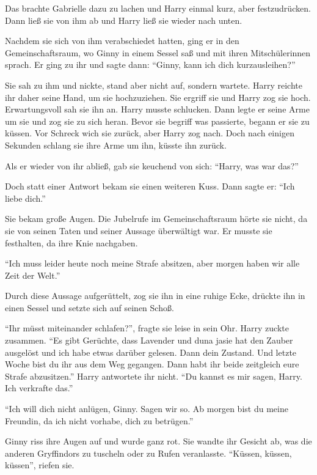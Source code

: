 Das brachte Gabrielle dazu zu lachen und Harry einmal kurz, aber festzudrücken. Dann ließ sie von ihm ab und Harry ließ sie wieder nach unten.

Nachdem sie sich von ihm verabschiedet hatten, ging er in den Gemeinschaftsraum, wo Ginny in einem Sessel saß und mit ihren Mitschülerinnen sprach. Er ging zu ihr und sagte dann: \enquote{Ginny, kann ich dich kurz\abs ausleihen?}

Sie sah zu ihm und nickte, stand aber nicht auf, sondern wartete. Harry reichte ihr daher seine Hand, um sie hochzuziehen. Sie ergriff sie und Harry zog sie hoch. Erwartungsvoll sah sie ihn an. Harry musste schlucken. Dann legte er seine Arme um sie und zog sie zu sich heran. Bevor sie begriff was passierte, begann er sie zu küssen. Vor Schreck wich sie zurück, aber Harry zog nach. Doch nach einigen Sekunden schlang sie ihre Arme um ihn, küsste ihn zurück.

Als er wieder von ihr abließ, gab sie keuchend von sich: \enquote{Harry, was war das?}

Doch statt einer Antwort bekam sie einen weiteren Kuss. Dann sagte er: \enquote{Ich liebe dich.}

Sie bekam große Augen. Die Jubelrufe im Gemeinschaftsraum hörte sie nicht, da sie von seinen Taten und seiner Aussage überwältigt war. Er musste sie festhalten, da ihre Knie nachgaben.

\enquote{Ich muss leider heute noch meine Strafe absitzen, aber morgen haben wir alle Zeit der Welt.}

Durch diese Aussage aufgerüttelt, zog sie ihn in eine ruhige Ecke, drückte ihn in einen Sessel und setzte sich auf seinen Schoß.

\enquote{Ihr müsst miteinander schlafen?}, fragte sie leise in sein Ohr. Harry zuckte zusammen. \enquote{Es gibt Gerüchte, dass Lavender und du\abs na ja\abs sie hat den Zauber ausgelöst und ich habe etwas darüber gelesen. Dann dein Zustand. Und letzte Woche bist du ihr aus dem Weg gegangen. Dann habt ihr beide zeitgleich eure Strafe abzusitzen.} Harry antwortete ihr nicht. \enquote{Du kannst es mir sagen, Harry. Ich verkrafte das.}

\enquote{Ich will dich nicht anlügen, Ginny. Sagen wir so. Ab morgen bist du meine Freundin, da ich nicht vorhabe, dich zu betrügen.}

Ginny riss ihre Augen auf und wurde ganz rot. Sie wandte ihr Gesicht ab, was die anderen Gryffindors zu tuscheln oder zu Rufen veranlasste. \enquote{Küssen, küssen, küssen}, riefen sie.

